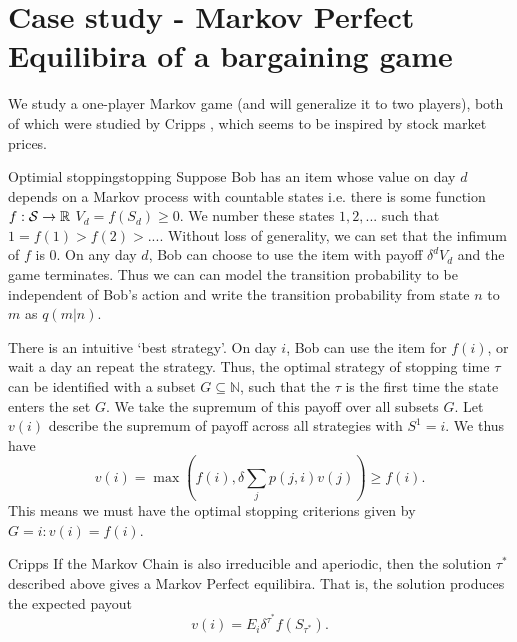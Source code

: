 \section{Case study - Markov Perfect Equilibira of a bargaining game}
We study a one-player Markov game (and will generalize it to two players), both of which were studied by Cripps \cite{Cripps1998}, which seems to be inspired by stock market prices.
\begin{aexample}{Optimial stopping}{stopping}
    Suppose Bob has an item whose value on day $d$ depends on a Markov process with countable states i.e. there is some function $f:\mathcal{S}\to \mathbb{R}$ $V_d=f(S_d)\geq 0$. We number these states $1,2,...$ such that $1=f(1)>f(2)>...$. Without loss of generality, we can set that the infimum of $f$ is 0. On any day $d$, Bob can choose to use the item with payoff $\delta^d V_d$ and the game terminates. Thus we can can model the transition probability to be independent of Bob's action and write the transition probability from state $n$ to $m$ as $q(m|n)$. 
\end{aexample}
There is an intuitive `best strategy'. On day $i$, Bob can use the item for $f(i)$, or wait a day an repeat the strategy. Thus, the optimal strategy of stopping time $\tau$ can be identified with a subset $G\subseteq \mathbb{N}$, such that the $\tau$ is the first time the state enters the set $G$. We take the supremum of this payoff over all subsets $G$. Let $v(i)$ describe the supremum of payoff across all strategies with $S^1=i$. We thus have \[
    v (i) = \max(f(i),\delta \sum_j p(j,i)v(j) ) \geq f(i).
\]
This means we must have the optimal stopping criterions given by $G={i:v(i)=f(i)}$.
\begin{alemma}{Cripps}{}
    If the Markov Chain is also irreducible and aperiodic, then the solution $\tau^*$ described above gives a Markov Perfect equilibira. That is, the solution produces the expected payout \[
    v(i) = E_i \delta^{\tau^*} f(S_{\tau^*}).
    \]
\end{alemma}

